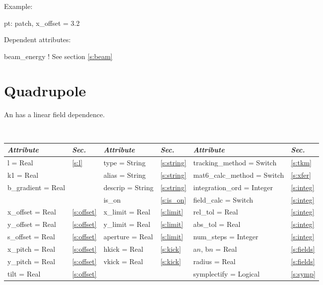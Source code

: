  \noindent
Example:
\begin{example}
  pt: patch, x\_offset = 3.2
\end{example}

\vskip0.05in \noindent
Dependent attributes:
\begin{example}
  beam\_energy  ! See section \ref{s:beam}
\end{example}

\section{Quadrupole}
\label{s:quad}

An  has a linear field dependence.

\toffset
\begin{center}
\tt
\begin{tabular}{|l|l||l|l||l|l|} \hline
  {\sl Attribute} & {\sl Sec.}  & {\sl Attribute} & {\sl Sec.} & {\sl Attribute} & {\sl Sec.} \\ \hline
  l        = Real       & \ref{s:l}      & type = String      & \ref{s:string} & tracking\_method = Switch   & \ref{s:tkm}   \\ \hline
  k1       = Real       &                & alias = String     & \ref{s:string} & mat6\_calc\_method = Switch & \ref{s:xfer}  \\ \hline
  b\_gradient = Real    &                & descrip = String   & \ref{s:string} & integration\_ord = Integer  & \ref{s:integ} \\ \hline
                        &                & is\_on             & \ref{s:is_on}  & field\_calc = Switch        & \ref{s:integ} \\ \hline
  x\_offset  = Real     & \ref{s:offset} & x\_limit = Real    & \ref{s:limit}  & rel\_tol = Real             & \ref{s:integ} \\ \hline
  y\_offset  = Real     & \ref{s:offset} & y\_limit = Real    & \ref{s:limit}  & abs\_tol = Real             & \ref{s:integ} \\ \hline
  s\_offset  = Real     & \ref{s:offset} & aperture = Real    & \ref{s:limit}  & num\_steps = Integer        & \ref{s:integ} \\ \hline
  x\_pitch = Real       & \ref{s:offset} & hkick    = Real    & \ref{s:kick}   & a$n$, b$n$ = Real           & \ref{s:fields}\\ \hline
  y\_pitch = Real       & \ref{s:offset} & vkick    = Real    & \ref{s:kick}   & radius = Real               & \ref{s:fields}\\ \hline
  tilt     = Real       & \ref{s:offset} &                    &                & symplectify = Logical       & \ref{s:symp}  \\ \hline
\end{tabular}
\end{center}
\toffset

